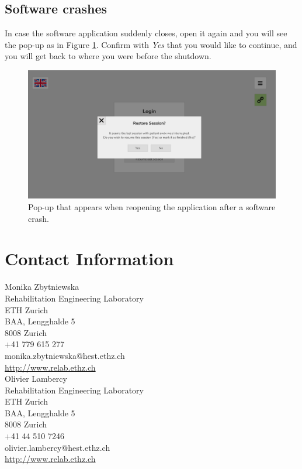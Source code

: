 \documentclass[10pt,oneside,a4paper]{article}
\begin{document}
\subsection{Software crashes}
In case the software application suddenly closes, open it again and you will see the pop-up as in Figure \ref{fig:Crash}. Confirm with \emph{Yes} that you would like to continue, and you will get back to where you were before the shutdown.

\begin{figure}[h!]
\begin{center}
\includegraphics[width=\columnwidth]{images/Troubleshooting/SoftwareCrash.png}
\caption{Pop-up that appears when reopening the application after a software crash.}
\label{fig:Crash}
\end{center}
\end{figure}

\newpage
\section{Contact Information}
Monika Zbytniewska\\
Rehabilitation Engineering Laboratory\\
ETH Zurich\\
BAA, Lengghalde 5\\
8008 Zurich\\
+41 779 615 277\\
monika.zbytniewska@hest.ethz.ch\\
\href{http://www.relab.ethz.ch}{http://www.relab.ethz.ch}\\

Olivier Lambercy\\
Rehabilitation Engineering Laboratory\\
ETH Zurich\\
BAA, Lengghalde 5\\
8008 Zurich\\
+41 44 510 7246\\
olivier.lambercy@hest.ethz.ch\\
\href{http://www.relab.ethz.ch}{http://www.relab.ethz.ch}\\
\end{document}
